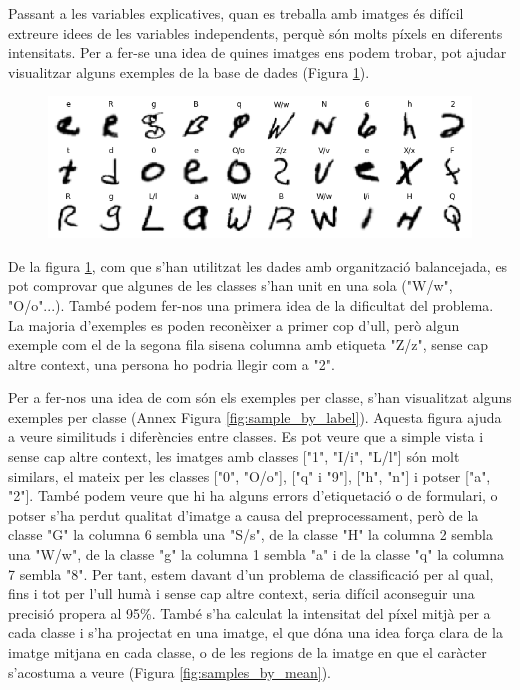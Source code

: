 \documentclass[12pt, spanish]{article}
\begin{document}
Passant a les variables explicatives, quan es treballa amb imatges és difícil extreure idees de les variables independents, perquè són molts píxels en diferents intensitats. Per a fer-se una idea de quines imatges ens podem trobar,  pot ajudar visualitzar alguns exemples de la base de dades (Figura \ref{fig:sample_random}).

\begin{figure}[hbt!]
\centering
	\includegraphics[width=1\textwidth]{images/samples_balanced.png}
	\label{fig:sample_random}
\end{figure}

De la figura \ref{fig:sample_random}, com que s'han utilitzat les dades amb organització balancejada, es pot comprovar que algunes  de les classes s'han unit en una sola ("W/w", "O/o"...). També podem fer-nos una primera idea de la dificultat del problema. La majoria d'exemples es poden reconèixer a primer cop d'ull, però algun exemple com el de la segona fila sisena columna amb etiqueta "Z/z", sense cap altre context, una persona ho podria llegir com a "2".

Per a fer-nos una idea de com són els exemples per classe, s'han visualitzat alguns exemples per classe (Annex Figura \ref{fig:sample_by_label}). Aquesta figura ajuda a veure similituds i diferències entre classes. Es pot veure que a simple vista i sense cap altre context, les imatges amb classes ["1", "I/i", "L/l"] són molt similars, el mateix per les classes ["0", "O/o"], ["q" i "9"], ["h", "n"] i potser ["a", "2"]. També podem veure que hi ha alguns errors d'etiquetació o de formulari, o potser s'ha perdut qualitat d'imatge a causa del preprocessament, però de la classe "G" la columna 6 sembla una "S/s", de la classe "H" la columna 2 sembla una "W/w", de la classe "g" la columna 1 sembla "a" i de la classe "q" la columna 7 sembla "8". Per tant, estem davant d'un problema de classificació per al qual, fins i tot per l'ull humà i sense cap altre context, seria difícil aconseguir una precisió propera al 95\%. També s'ha calculat la intensitat del píxel mitjà per a cada classe i s'ha projectat en una imatge, el que dóna una idea força clara de la imatge mitjana en cada classe, o de les regions de la imatge en que el caràcter s'acostuma a veure (Figura \ref{fig:samples_by_mean}).
\end{document}
